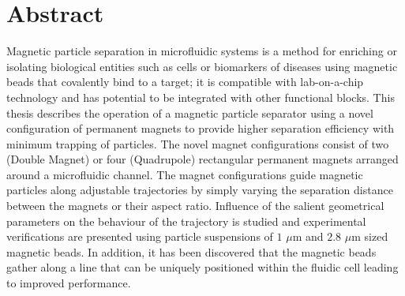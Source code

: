 



 \cleardoublepage

\chapter*{Abstract}
 
Magnetic particle separation in microfluidic systems is a method for enriching or isolating biological entities such as cells or biomarkers of diseases using magnetic beads that covalently bind to a target; it is compatible with lab-on-a-chip technology and has potential to be integrated with other functional blocks. This thesis describes the operation of a magnetic particle separator using a novel configuration of permanent magnets to provide higher separation efficiency with minimum trapping of particles. The novel magnet configurations consist of two (Double Magnet) or four (Quadrupole) rectangular permanent magnets arranged around a microfluidic channel. The magnet configurations guide magnetic particles along adjustable trajectories by simply varying the separation distance between the magnets or their aspect ratio. Influence of the salient geometrical parameters on the behaviour of the trajectory is studied and experimental verifications are presented using particle suspensions of  $1$ $\mu$m and $2.8$ $\mu$m sized magnetic beads. In addition, it has been discovered that the magnetic beads gather along a line that can be uniquely positioned within the fluidic cell leading to improved performance. 

